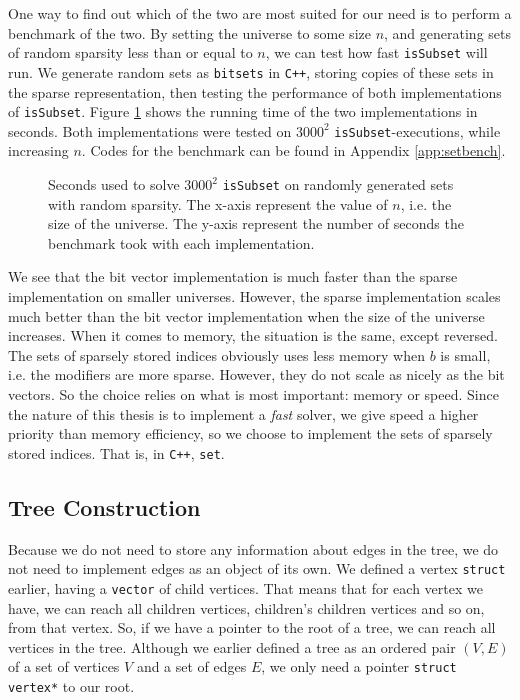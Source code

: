 One way to find out which of the two are most suited for our need is to perform
a benchmark of the two.
By setting the universe to some size $n$, and generating sets of
random sparsity less than or equal to $n$, we can test how fast
\texttt{isSubset} will run.
We generate random sets as \texttt{bitsets} in \texttt{C++}, storing copies
of these sets in the sparse representation, then testing the performance 
of both implementations of \texttt{isSubset}.
Figure \ref{fig:setspeed}
shows the running time of the two implementations in seconds. Both
implementations were tested on $3000^2$ \texttt{isSubset}-executions, while
increasing $n$.
Codes for the benchmark can be found in Appendix \ref{app:setbench}.
\begin{figure}[ht!]
\centering

\caption{Seconds used to solve $3000^2$ \texttt{isSubset} on randomly
         generated sets with random sparsity. The x-axis represent 
         the value of $n$, i.e. the size of the universe. The y-axis
         represent the number of seconds the benchmark took with each
         implementation.}
\label{fig:setspeed}
\end{figure}

We see that the bit vector implementation is much faster than the sparse
implementation on smaller universes. However, the sparse implementation
scales much better than the bit vector implementation when the size of
the universe increases. When it comes to memory, the situation is the same,
except reversed. The sets of sparsely stored indices obviously uses less
memory when $b$ is small, i.e. the modifiers are more sparse. However, they
do not scale as nicely as the bit vectors. So the choice relies on what is
most important: memory or speed. Since the nature of this thesis is to
implement a \emph{fast} solver, we give speed a higher priority than memory 
efficiency, so we choose to implement the sets of sparsely stored
indices. That is, in \texttt{C++}, \texttt{set}.

\subsection{Tree Construction}
Because we do not need to store any information about edges in the tree,
we do not need to implement edges as an object of its own. We defined
a vertex \texttt{struct} earlier, having a \texttt{vector} of child
vertices. That means that for each vertex we have, we can reach all children
vertices, children's children vertices and so on, from that vertex.
So, if we have a pointer to the root of a tree, we can reach all vertices
in the tree. Although we earlier defined a tree as an ordered pair
$(V, E)$ of a set of vertices $V$ and a set of edges $E$, we only need a
pointer \texttt{struct vertex*} to our root.

